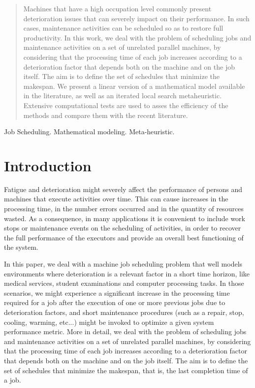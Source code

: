 \documentclass[a4paper,11pt]{article}
\begin{document}
\begin{abstract}
Machines that have a high occupation level commonly present deterioration issues that can severely impact on their performance. In such cases, maintenance activities can be scheduled so as to restore full productivity. In this work, we deal with the problem of scheduling jobs and maintenance activities on a set of unrelated parallel machines, by considering that the processing time of each job increases according to a deterioration factor that depends both on the machine and on the job itself. The aim is to define the set of schedules that minimize the makespan. 
We present a linear version of a mathematical model available in the literature, as well as an iterated local search metaheuristic. Extensive computational tests are used to asses the efficiency of the methods and compare them with the recent literature. 
\end{abstract}

\bigskip
\begin{keywords}Job Scheduling. Mathematical modeling. Meta-heuristic.

\bigskip
{}
\end{keywords}

\newpage
\section{Introduction} \label{sec:intro}
 
Fatigue and deterioration might severely affect the performance of persons and machines that execute activities over time. This can cause increases in the processing time, in the number errors occurred and in the quantity of resources wasted. As a consequence, in many applications it is convenient to include work stops or maintenance events on the scheduling of activities, in order to recover the full performance of the executors and provide an overall best functioning of the system. 
 
 In this paper, we deal with a machine job scheduling problem that well models environments where deterioration is a relevant factor in a short time horizon, like medical services, student examinations and computer processing tasks. In those scenarios, we might experience a significant increase in the processing time required for a job after the execution of one or more previous jobs due to deterioration factors, and short maintenance procedures (such as a repair, stop, cooling, warming, etc...) might be invoked to optimize a given system performance metric.  More in detail, we deal with the problem of scheduling jobs and maintenance activities on a set of unrelated parallel machines, by considering that the processing time of each job increases according to a deterioration factor that depends both on the machine and on the job itself. The aim is to define the set of schedules that minimize the makespan, that is, the last completion time of a job.
 
\end{document}
